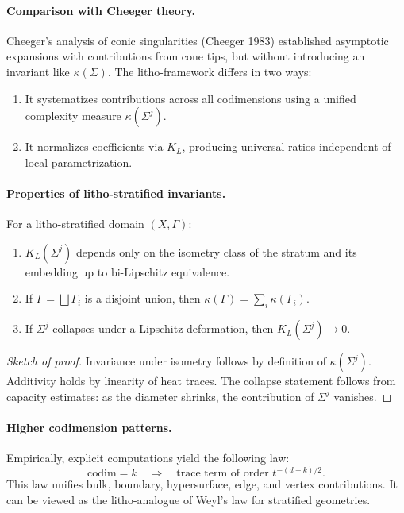 \paragraph{Comparison with Cheeger theory.}
Cheeger’s analysis of conic singularities (Cheeger 1983)
established asymptotic expansions with contributions from cone tips,
but without introducing an invariant like $\kappa(\Sigma)$.
The litho-framework differs in two ways:
\begin{enumerate}
\item It systematizes contributions across all codimensions
using a unified complexity measure $\kappa(\Sigma^j)$.
\item It normalizes coefficients via $K_L$,
producing universal ratios independent of local parametrization.
\end{enumerate}

\paragraph{Properties of litho-stratified invariants.}
\begin{proposition}
For a litho-stratified domain $(X,\Gamma)$:
\begin{enumerate}
\item $K_L(\Sigma^j)$ depends only on the isometry class of the stratum
and its embedding up to bi-Lipschitz equivalence.
\item If $\Gamma=\bigsqcup \Gamma_i$ is a disjoint union,
then $\kappa(\Gamma)=\sum_i \kappa(\Gamma_i)$.
\item If $\Sigma^{j}$ collapses under a Lipschitz deformation,
then $K_L(\Sigma^j)\to 0$.
\end{enumerate}
\end{proposition}

\begin{proof}[Sketch of proof]
Invariance under isometry follows by definition of $\kappa(\Sigma^j)$.
Additivity holds by linearity of heat traces.
The collapse statement follows from capacity estimates:
as the diameter shrinks, the contribution of $\Sigma^j$ vanishes.
\end{proof}

\paragraph{Higher codimension patterns.}
Empirically, explicit computations yield the following law:
\[
\text{codim}=k \quad \Longrightarrow \quad \text{trace term of order } t^{-(d-k)/2}.
\]
This law unifies bulk, boundary, hypersurface, edge, and vertex contributions.
It can be viewed as the litho-analogue of Weyl’s law for stratified geometries.

